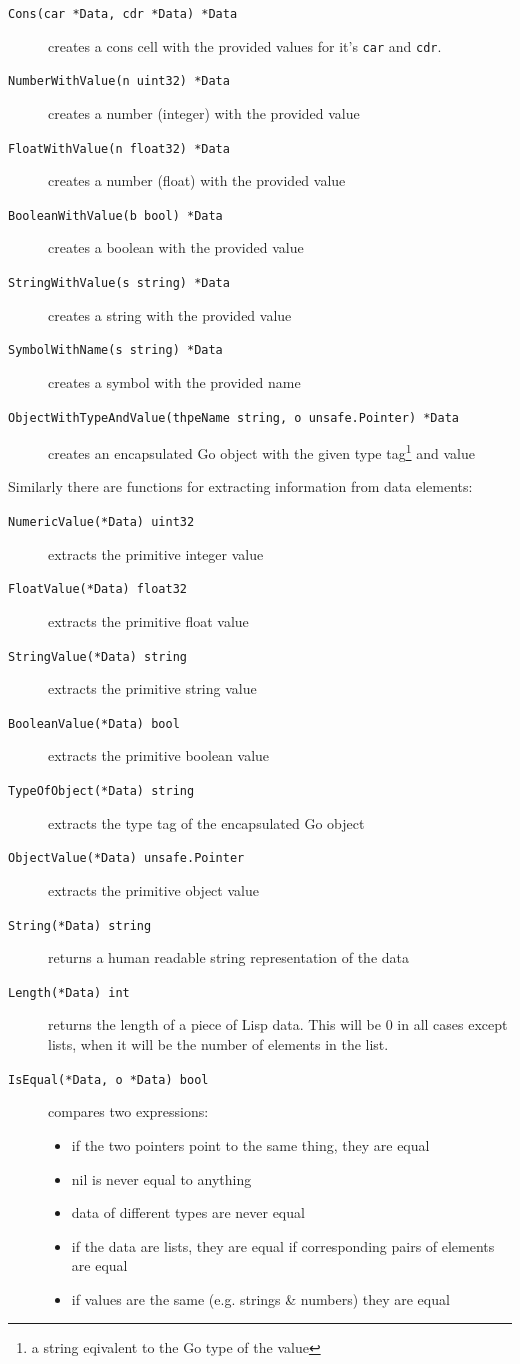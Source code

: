 \documentclass[12pt]{article}
\begin{document}
\begin{description}
\item [{\tt Cons(car *Data, cdr *Data) *Data}] creates a cons cell
  with the provided values for it's \verb|car| and \verb|cdr|.
\item [{\tt NumberWithValue(n uint32) *Data}] creates a number (integer)
  with the provided value
\item [{\tt FloatWithValue(n float32) *Data}] creates a number (float)
  with the provided value
\item [{\tt BooleanWithValue(b bool) *Data}] creates a boolean with
  the provided value
\item [{\tt StringWithValue(s string) *Data}] creates a string with
  the provided value
\item [{\tt SymbolWithName(s string) *Data}] creates a symbol with the
  provided name
\item [{\tt ObjectWithTypeAndValue(thpeName string, o unsafe.Pointer) *Data}]
  creates an encapsulated Go object with the given type tag\footnote{a
    string eqivalent to the Go type of the value} and value
\end{description}

\noindent Similarly there are functions for extracting information
from data elements:

\begin{description}
\item [{\tt NumericValue(*Data) uint32}] extracts the primitive integer value
\item [{\tt FloatValue(*Data) float32}] extracts the primitive float value
\item [{\tt StringValue(*Data) string}] extracts the primitive
  string value
\item [{\tt BooleanValue(*Data) bool}] extracts the primitive
  boolean value
\item [{\tt TypeOfObject(*Data) string}] extracts the type tag of the
    encapsulated Go object
\item [{\tt ObjectValue(*Data) unsafe.Pointer}] extracts the
  primitive object value
\item [{\tt String(*Data) string}] returns a human readable string
  representation of the data
\item [{\tt Length(*Data) int}] returns the length of a piece of Lisp
  data. This will be 0 in all cases except lists, when it will be the
  number of elements in the list.
\item [{\tt IsEqual(*Data, o *Data) bool}] compares two expressions:
  \begin{itemize}
  \item if the two pointers point to the same thing, they are equal
  \item nil is never equal to anything
  \item data of different types are never equal
  \item if the data are lists, they are equal if corresponding pairs
    of elements are equal
  \item if values are the same (e.g. strings \& numbers) they are equal
  \end{itemize}
\end{description}
\end{document}
